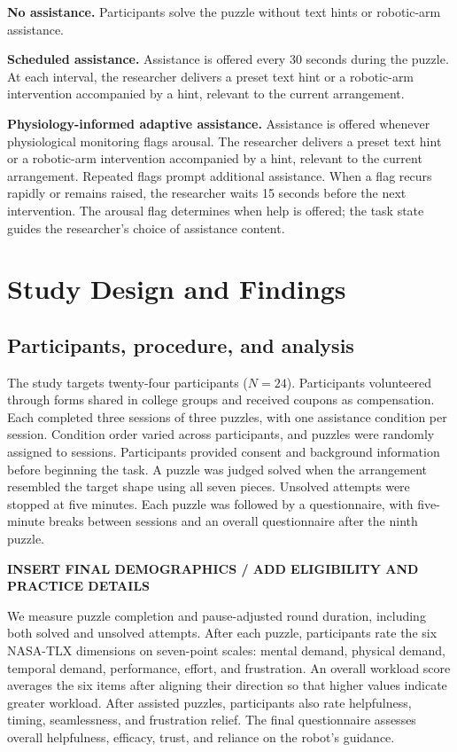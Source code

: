 \documentclass[sigconf,anonymous]{aamas}
\begin{document}
\textbf{No assistance.} Participants solve the puzzle without text hints or robotic-arm assistance.

\textbf{Scheduled assistance.} Assistance is offered every 30 seconds during the puzzle. At each interval, the researcher delivers a preset text hint or a robotic-arm intervention accompanied by a hint, relevant to the current arrangement.

\textbf{Physiology-informed adaptive assistance.} Assistance is offered whenever physiological monitoring flags arousal. The researcher delivers a preset text hint or a robotic-arm intervention accompanied by a hint, relevant to the current arrangement. Repeated flags prompt additional assistance. When a flag recurs rapidly or remains raised, the researcher waits 15 seconds before the next intervention. The arousal flag determines when help is offered; the task state guides the researcher’s choice of assistance content.

\section{Study Design and Findings}

\subsection{Participants, procedure, and analysis}

The study targets twenty-four participants ($N=24$). Participants volunteered through forms shared in college groups and received coupons as compensation. Each completed three sessions of three puzzles, with one assistance condition per session. Condition order varied across participants, and puzzles were randomly assigned to sessions. Participants provided consent and background information before beginning the task. A puzzle was judged solved when the arrangement resembled the target shape using all seven pieces. Unsolved attempts were stopped at five minutes. Each puzzle was followed by a questionnaire, with five-minute breaks between sessions and an overall questionnaire after the ninth puzzle.

\textbf{INSERT FINAL DEMOGRAPHICS / ADD ELIGIBILITY AND PRACTICE DETAILS}

We measure puzzle completion and pause-adjusted round duration, including both solved and unsolved attempts. After each puzzle, participants rate the six NASA-TLX dimensions on seven-point scales: mental demand, physical demand, temporal demand, performance, effort, and frustration. An overall workload score averages the six items after aligning their direction so that higher values indicate greater workload. After assisted puzzles, participants also rate helpfulness, timing, seamlessness, and frustration relief. The final questionnaire assesses overall helpfulness, efficacy, trust, and reliance on the robot's guidance.
\end{document}
